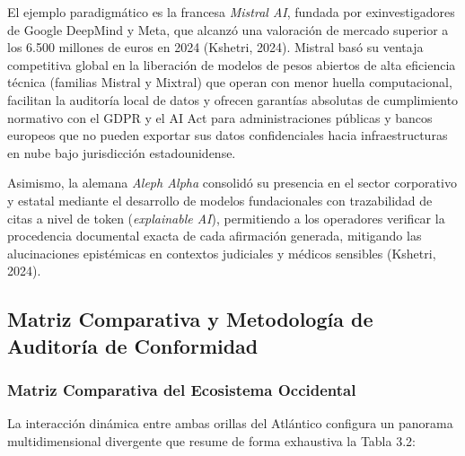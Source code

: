 El ejemplo paradigmático es la francesa \textit{Mistral AI}, fundada por exinvestigadores de Google DeepMind y Meta, que alcanzó una valoración de mercado superior a los 6.500 millones de euros en 2024 (Kshetri, 2024). Mistral basó su ventaja competitiva global en la liberación de modelos de pesos abiertos de alta eficiencia técnica (familias Mistral y Mixtral) que operan con menor huella computacional, facilitan la auditoría local de datos y ofrecen garantías absolutas de cumplimiento normativo con el GDPR y el AI Act para administraciones públicas y bancos europeos que no pueden exportar sus datos confidenciales hacia infraestructuras en nube bajo jurisdicción estadounidense.

Asimismo, la alemana \textit{Aleph Alpha} consolidó su presencia en el sector corporativo y estatal mediante el desarrollo de modelos fundacionales con trazabilidad de citas a nivel de token (\textit{explainable AI}), permitiendo a los operadores verificar la procedencia documental exacta de cada afirmación generada, mitigando las alucinaciones epistémicas en contextos judiciales y médicos sensibles (Kshetri, 2024).

\subsection{Matriz Comparativa y Metodología de Auditoría de Conformidad}

\subsubsection{Matriz Comparativa del Ecosistema Occidental}

La interacción dinámica entre ambas orillas del Atlántico configura un panorama multidimensional divergente que resume de forma exhaustiva la Tabla 3.2:

